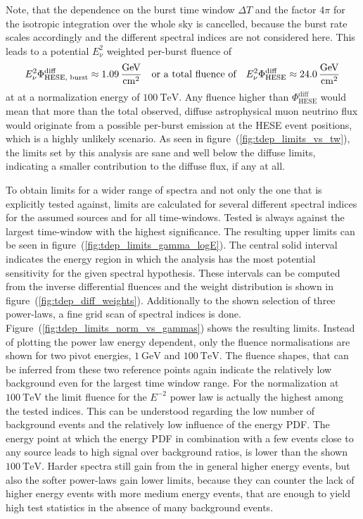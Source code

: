 Note, that the dependence on the burst time window $\Delta T$ and the factor $4\pi$ for the isotropic integration over the whole sky is cancelled, because the burst rate scales accordingly and the different spectral indices are not considered here.
This leads to a potential $E_\nu^2$ weighted per-burst fluence of
\begin{equation}
    E_\nu^2\Phi_\text{HESE, burst}^\text{diff}
      \approx \SI{1.09}{\GeV\per\cm\squared}
    \mintertext{or a total fluence of}
    E_\nu^2\Phi_\text{HESE}^\text{diff}
      \approx \SI{24.0}{\GeV\per\cm\squared}
\end{equation}
at at a normalization energy of $\SI{100}{\TeV}$.
Any fluence higher than $\Phi_\text{HESE}^\text{diff}$ would mean that more than the total observed, diffuse astrophysical muon neutrino flux would originate from a possible per-burst emission at the HESE event positions, which is a highly unlikely scenario.
As seen in figure~(\ref{fig:tdep_limits_vs_tw}), the limits set by this analysis are sane and well below the diffuse limits, indicating a smaller contribution to the diffuse flux, if any at all.

To obtain limits for a wider range of spectra and not only the one that is explicitly tested against, limits are calculated for several different spectral indices for the assumed sources and for all time-windows.
Tested is always against the largest time-window with the highest significance.
The resulting upper limits can be seen in figure~(\ref{fig:tdep_limits_gamma_logE}).
The central solid interval indicates the energy region in which the analysis has the most potential sensitivity for the given spectral hypothesis.
These intervals can be computed from the inverse differential fluences and the weight distribution is shown in figure~(\ref{fig:tdep_diff_weights}).
Additionally to the shown selection of three power-laws, a fine grid scan of spectral indices is done.
Figure~(\ref{fig:tdep_limits_norm_vs_gammas}) shows the resulting limits.
Instead of plotting the power law energy dependent, only the fluence normalisations are shown for two pivot energies, $\SI{1}{\GeV}$ and $\SI{100}{\TeV}$.
The fluence shapes, that can be inferred from these two reference points again indicate the relatively low background even for the largest time window range.
For the normalization at $\SI{100}{\TeV}$ the limit fluence for the $E^{-2}$ power law is actually the highest among the tested indices.
This can be understood regarding the low number of background events and the relatively low influence of the energy PDF.
The energy point at which the energy PDF in combination with a few events close to any source leads to high signal over background ratios, is lower than the shown $\SI{100}{\TeV}$.
Harder spectra still gain from the in general higher energy events, but also the softer power-laws gain lower limits, because they can counter the lack of higher energy events with more medium energy events, that are enough to yield high test statistics in the absence of many background events.


